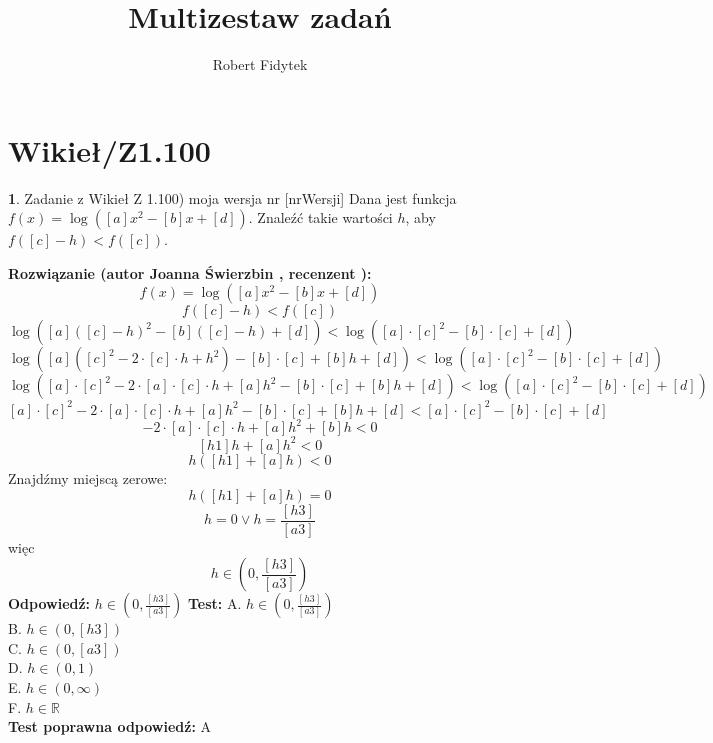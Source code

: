 \documentclass[12pt, a4paper]{article}
\title{Multizestaw zadań}
\author{Robert Fidytek}
\date{}
\theoremstyle{definition} %
\newtheorem{zad}{}
\newcommand{\kategoria}[1]{\section{#1}} %
\newcommand{\zadStart}[1]{\begin{zad}#1\newline} %
\newcommand{\zadStop}{\end{zad}}   %
\newcommand{\rozwStart}[2]{\noindent \textbf{Rozwiązanie (autor #1 , recenzent #2): }\newline} %
\newcommand{\rozwStop}{\newline}                                            %
\newcommand{\odpStart}{\noindent \textbf{Odpowiedź:}\newline}    %
\newcommand{\odpStop}{\newline}                                             %
\newcommand{\testStart}{\noindent \textbf{Test:}\newline} %
\newcommand{\testStop}{\newline} %
\newcommand{\kluczStart}{\noindent \textbf{Test poprawna odpowiedź:}\newline} %
\newcommand{\kluczStop}{\newline} %
\begin{document}
\maketitle


\kategoria{Wikieł/Z1.100}
\zadStart{Zadanie z Wikieł Z 1.100) moja wersja nr [nrWersji]}
Dana jest funkcja $f(x)=\log([a]x^2-[b]x+[d])$. Znaleźć takie wartości $h$, aby $f([c]-h)<f([c])$.
\zadStop
\rozwStart{Joanna Świerzbin}{}
$$f(x)=\log([a]x^2-[b]x+[d])$$
$$f([c]-h)<f([c])$$
$$\log([a]([c]-h)^2-[b]([c]-h)+[d])<\log([a]\cdot[c]^2-[b]\cdot [c]+[d])$$
$$\log([a]([c]^2-2\cdot[c]\cdot h +h^2)-[b]\cdot[c]+[b]h+[d])<\log([a]\cdot[c]^2-[b]\cdot [c]+[d])$$
$$\log([a]\cdot[c]^2-2\cdot[a]\cdot[c]\cdot h +[a]h^2-[b]\cdot[c]+[b]h+[d])<\log([a]\cdot[c]^2-[b]\cdot [c]+[d])$$
$$[a]\cdot[c]^2-2\cdot[a]\cdot[c]\cdot h +[a]h^2-[b]\cdot[c]+[b]h+[d]<[a]\cdot[c]^2-[b]\cdot [c]+[d]$$
$$-2\cdot[a]\cdot[c]\cdot h +[a]h^2+[b]h<0$$
$$[h1] h +[a]h^2<0$$
$$h([h1] +[a]h)<0$$
Znajdźmy miejscą zerowe:
$$h([h1] +[a]h)=0$$
$$h=0 \lor  h=\frac{[h3]}{[a3]}$$
więc
$$h \in \left(0,\frac{[h3]}{[a3]}\right)$$
\rozwStop
\odpStart
$h \in \left(0,\frac{[h3]}{[a3]}\right)$
\odpStop
\testStart
A. $h \in \left(0,\frac{[h3]}{[a3]}\right)$\\
B. $h \in \left(0, [h3]\right)$\\
C. $h \in \left(0,[a3] \right)$\\
D. $h \in \left(0,1 \right)$\\
E. $h \in \left(0,\infty\right)$\\
F. $h \in \mathbb{R}$\\
\testStop
\kluczStart
A
\kluczStop
\end{document}
